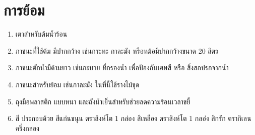 \section{การย้อม}

\begin{enumerate}
\def\labelenumi{(\arabic{enumi})}
\item
  เตาสำหรับต้มน้ำร้อน
\item
  ภาชนะที่ใช้ต้ม มีปากกว้าง เช่นกระทะ กาละมัง หรือหม้อมีปากกว้างขนาด 20
  ลิตร
\item
  ภาชนะตักน้ำมีด้ามยาว เช่นกะบวย ที่กรองน้ำ เพื่อป้องกันเศษสี หรือ
  สิ่งสกปรกจากน้ำ
\item
  ภาชนะสำหรับย้อม เช่นกาละมัง ในที่นี้ใช้รางไม้ขุด
\item
  ถุงมือพลาสติก แบบหนา และถังน้ำเย็นสำหรับช่วยลดความร้อนเวลาขยี้
\item
  สี ประกอบด้วย สีแก่นขนุน ตราสิงห์โต 1 กล่อง สีเหลือง ตราสิงห์โต 1
  กลอ่ง สีกรัก ตรากิเลน ครึ่งกล่อง
\end{enumerate}

